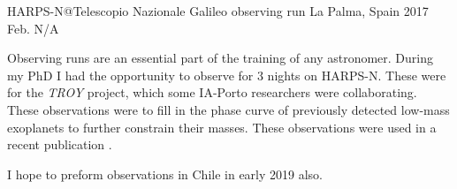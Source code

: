 {HARPS-N@Telescopio Nazionale Galileo observing run}
{La Palma, Spain}%
{2017 Feb.}%
{N/A}%
{}%
{Observing runs are an essential part of the training of any astronomer. 
    During my PhD I had the opportunity to observe for 3 nights on HARPS-N. These were for the \emph{TROY} project, which some IA-Porto researchers were collaborating.  These observations were to fill in the phase curve of previously detected low-mass exoplanets to further constrain their masses. These observations were used in a recent publication \citet{lillo-box_troy_2018}.
    
    {\red I hope to preform observations in Chile in early 2019 also.}
}%
